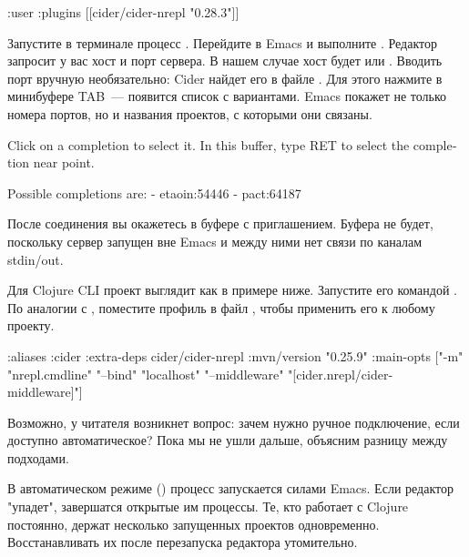 \begin{english}
  \begin{clojure}
{:user
 {:plugins
  [[cider/cider-nrepl "0.28.3"]]}}
  \end{clojure}
\end{english}

Запустите в терминале процесс . Перейдите в Emacs и выполните . Редактор запросит у вас хост и порт сервера. В нашем случае хост будет  или . Вводить порт вручную необязательно: Cider найдет его в файле . Для этого нажмите в минибуфере TAB~--- появится список с вариантами. Emacs покажет не только номера портов, но и названия проектов, с которыми они связаны.

\begin{english}
  \begin{text}
Click on a completion to select it.
In this buffer, type RET to select the completion near point.

Possible completions are:
- etaoin:54446
- pact:64187
  \end{text}
\end{english}

После соединения вы окажетесь в буфере  с приглашением. Буфера  не будет, поскольку сервер запущен вне Emacs и между ними нет связи по каналам stdin/out.

Для Clojure CLI проект выглядит как в примере ниже. Запустите его командой . По аналогии с , поместите профиль  в файл , чтобы применить его к любому проекту.

\begin{english}
  \begin{clojure}
{:aliases
 {:cider
  {:extra-deps
   {cider/cider-nrepl {:mvn/version "0.25.9"}}
   :main-opts
   ["-m" "nrepl.cmdline"
    "--bind" "localhost"
    "--middleware" "[cider.nrepl/cider-middleware]"]}}}
  \end{clojure}
\end{english}

Возможно, у читателя возникнет вопрос: зачем нужно ручное подключение, если доступно автоматическое? Пока мы не ушли дальше, объясним разницу между подходами.

В автоматическом режиме () процесс  запускается силами Emacs. Если редактор "упадет", завершатся открытые им процессы. Те, кто работает с Clojure постоянно, держат несколько запущенных проектов одновременно. Восстанавливать их после перезапуска редактора утомительно.


